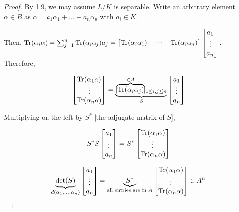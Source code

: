 \documentclass[openany]{amsbook}
\numberwithin{section}{chapter}
\theoremstyle{definition}
\begin{document}
\begin{proof}
    By 1.9, we may assume \(L / K\) is separable. Write an arbitrary element \(\alpha \in B\) as \(\alpha = a_1 \alpha _1 + \dots + a_n \alpha_n\) with \(a_i \in K\).

    Then, \(\Tr(\alpha_i \alpha) = \sum_{j=1}^{n} \Tr(\alpha_i \alpha_j)a_j = \begin{bmatrix}
        \Tr(\alpha_i \alpha_1) & \cdots &  \Tr(\alpha_i \alpha_n)  \\
    \end{bmatrix}\begin{bmatrix}
        a_1 \\
        \vdots \\
        a_n \\
   \end{bmatrix}\). Therefore,

   \[
    \begin{bmatrix}
        \Tr(\alpha_1 \alpha) \\
        \vdots \\
        \Tr(\alpha_n \alpha) \\
      \end{bmatrix}=\underbrace{[\overbrace{\Tr(\alpha_i \alpha_j)}^{\in A}]_{1 \leq i, j \leq n}}_{S} \begin{bmatrix}
             a_1 \\
             \vdots \\
             a_n \\
        \end{bmatrix}
   \]

    Multiplying on the left by \(S^{\ast}\) [the adjugate matrix of \(S\)],

    \[S^{\ast} S \begin{bmatrix}
         a_1 \\
         \vdots \\
         a_n \\
    \end{bmatrix} = S^{\ast} \begin{bmatrix}
         \Tr(\alpha_1 \alpha) \\
         \vdots \\
         \Tr(\alpha_n \alpha) \\
    \end{bmatrix}
    \] 

    \[\underbrace{\det(S)}_{d(\alpha_1, \dots , \alpha_n)} \begin{bmatrix}
        a_1 \\
        \vdots \\
        a_n \\
   \end{bmatrix} = \underbrace{S^{\ast}}_{\text{all entries are in } A} \begin{bmatrix}
        \Tr(\alpha_1 \alpha) \\
        \vdots \\
        \Tr(\alpha_n \alpha)\\
   \end{bmatrix} \in A^n
   \]


\end{proof}
\end{document}
